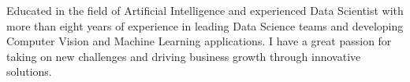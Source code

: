 %
%
%
\par{
Educated in the field of Artificial Intelligence and experienced Data Scientist with more than eight years of experience in leading Data Science teams and developing Computer Vision and Machine Learning applications. I have a great passion for taking on new challenges and driving business growth through innovative solutions.
}
\vspace{6.6mm}